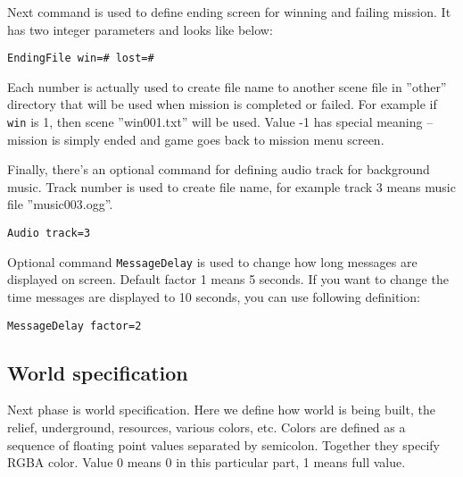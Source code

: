 Next command is used to define ending screen for winning and failing mission. It has two integer parameters and looks like below:

\begin{verbatim}
EndingFile win=# lost=#
\end{verbatim}

Each number is actually used to create file name to another scene file in ''other'' directory that will be used when mission is completed or failed. For example if \texttt{win} is 1, then scene ''win001.txt'' will be used. Value -1 has special meaning -- mission is simply ended and game goes back to mission menu screen.


Finally, there's an optional command for defining audio track for background music. Track number is used to create file name, for example track 3 means music file ''music003.ogg''.
\begin{verbatim}
Audio track=3
\end{verbatim}



Optional command \texttt{MessageDelay} is used to change how long messages are displayed on screen. Default factor 1 means 5 seconds. If you want to change the time messages are displayed to 10 seconds, you can use following definition:

\begin{verbatim}
MessageDelay factor=2
\end{verbatim}


\subsection{World specification}

Next phase is world specification. Here we define how world is being built, the relief, underground, resources, various colors, etc. Colors are defined as a sequence of floating point values separated by semicolon. Together they specify RGBA color. Value 0 means 0 in this particular part, 1 means full value.

